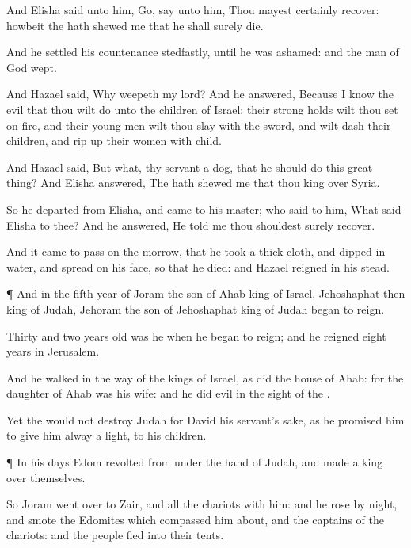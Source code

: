 {And
Elisha
said unto him,
Go,
say unto him, Thou mayest
certainly
recover: howbeit the
{} hath
shewed me that he shall
surely
die.

And he
settled his
countenance
stedfastly, until he was
ashamed: and the
man of
God
wept.

And
Hazael
said, Why
weepeth my
lord? And he
answered, Because I
know the
evil that thou wilt
do unto the
children of
Israel: their strong
holds wilt thou
set on
fire, and their young
men wilt thou
slay with the
sword, and wilt
dash their
children, and rip
up their women with
child.

And
Hazael
said, But what,
{} thy
servant a
dog, that he should
do this
great
thing? And
Elisha
answered, The
{} hath
shewed me that thou
{}
king over
Syria.

So he
departed from
Elisha, and
came to his
master; who
said to him, What
said
Elisha to thee? And he
answered, He
told me
{} thou shouldest
surely
recover.

And it came to pass on the
morrow, that he
took a thick
cloth, and
dipped
{} in
water, and
spread
{} on his
face, so that he
died: and
Hazael
reigned in his stead.


\par }{\PP {}¶ And in the
fifth
year of
Joram the
son of
Ahab
king of
Israel,
Jehoshaphat
{} then
king of
Judah,
Jehoram the
son of
Jehoshaphat
king of
Judah began to
reign.

Thirty and
two
years
old was he when he began to
reign; and he
reigned
eight
years in
Jerusalem.

And he
walked in the
way of the
kings of
Israel, as
did the
house of
Ahab: for the
daughter of
Ahab was his
wife: and he
did
evil in the
sight of the
{}.

Yet the
{}
would not
destroy
Judah for
David his
servant’s sake, as he
promised him to
give him
alway a
light,
{} to his
children.


\par }{\PP {}¶ In his
days
Edom
revolted from under the
hand of
Judah, and
made a
king over themselves.

So
Joram went
over to
Zair, and all the
chariots with him: and he
rose by
night, and
smote the
Edomites which compassed him
about, and the
captains of the
chariots: and the
people
fled into their
tents.

}
